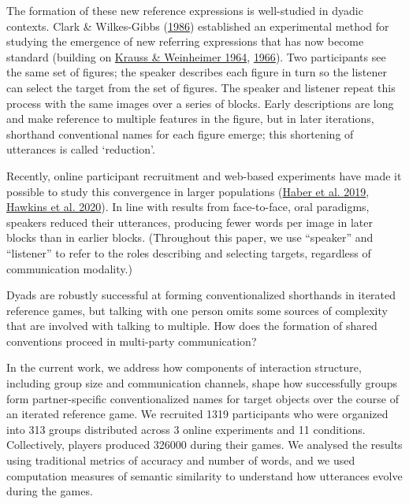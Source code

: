 \documentclass[
  english,
  a4paper,
]{article}
\begin{document}
The formation of these new reference expressions is well-studied in dyadic contexts. Clark \& Wilkes-Gibbs (\protect\hyperlink{ref-clarkReferringCollaborativeProcess1986}{1986}) established an experimental method for studying the emergence of new referring expressions that has now become standard (building on \protect\hyperlink{ref-kraussChangesReferencePhrases1964}{Krauss \& Weinheimer 1964}, \protect\hyperlink{ref-kraussConcurrentFeedbackConfirmation1966}{1966}). Two participants see the same set of figures; the speaker describes each figure in turn so the listener can select the target from the set of figures. The speaker and listener repeat this process with the same images over a series of blocks. Early descriptions are long and make reference to multiple features in the figure, but in later iterations, shorthand conventional names for each figure emerge; this shortening of utterances is called `reduction'.

Recently, online participant recruitment and web-based experiments have made it possible to study this convergence in larger populations (\protect\hyperlink{ref-haber2019}{Haber et al. 2019}, \protect\hyperlink{ref-hawkinsCharacterizingDynamicsLearning2020}{Hawkins et al. 2020}). In line with results from face-to-face, oral paradigms, speakers reduced their utterances, producing fewer words per image in later blocks than in earlier blocks. (Throughout this paper, we use ``speaker'' and ``listener'' to refer to the roles describing and selecting targets, regardless of communication modality.)

Dyads are robustly successful at forming conventionalized shorthands in iterated reference games, but talking with one person omits some sources of complexity that are involved with talking to multiple. How does the formation of shared conventions proceed in multi-party communication?

In the current work, we address how components of interaction structure, including group size and communication channels, shape how successfully groups form partner-specific conventionalized names for target objects over the course of an iterated reference game. We recruited 1319 participants who were organized into 313 groups distributed across 3 online experiments and 11 conditions. Collectively, players produced 326000 during their games. We analysed the results using traditional metrics of accuracy and number of words, and we used computation measures of semantic similarity to understand how utterances evolve during the games.
\end{document}
